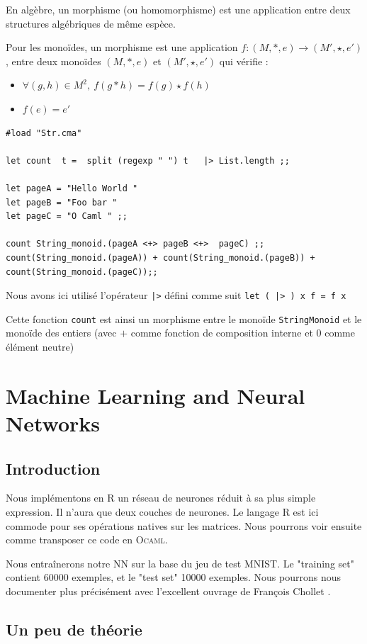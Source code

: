 En algèbre, un morphisme (ou homomorphisme) est une application entre deux structures algébriques
de même espèce.

Pour les  monoïdes, un morphisme est une application 
$f:(M,*,e)\longrightarrow (M',\star ,e')$ , entre deux monoïdes $ (M,*,e)$ et 
$(M',\star , e')$ qui vérifie :
\begin{itemize}
	\item $\forall (g,h)\in M^{2},~f(g*h)=f(g)\star f(h)$
	\item $f(e)=e'$
\end{itemize}
\begin{verbatim}
#load "Str.cma"

let count  t =  split (regexp " ") t   |> List.length ;;

let pageA = "Hello World "
let pageB = "Foo bar "
let pageC = "O Caml " ;;

count String_monoid.(pageA <+> pageB <+>  pageC) ;;
count(String_monoid.(pageA)) + count(String_monoid.(pageB)) + count(String_monoid.(pageC));;
\end{verbatim}
Nous avons ici utilisé l'opérateur \texttt{|>} défini comme suit \texttt{let ( |> ) x f = f x}

Cette fonction \texttt{count} est ainsi un morphisme entre le monoïde \texttt{StringMonoid} et 
le monoïde des entiers (avec $+$ comme fonction de composition interne et $0$
comme élément neutre)
\section{Machine Learning and Neural Networks}

\subsection{Introduction}

Nous implémentons en R un réseau de neurones réduit à sa plus simple expression.
Il n'aura que deux couches de neurones.
Le langage R est ici commode pour ses opérations natives sur les matrices.
Nous pourrons voir ensuite comme transposer ce code en \textsc{Ocaml}.

Nous entraînerons notre NN sur la base du jeu de test MNIST.
Le  "training set" contient 60000 exemples, et le "test set" 10000 exemples.
Nous pourrons nous documenter plus précisément avec l'excellent ouvrage de François Chollet \cite{deepR}.

\subsection{Un peu de théorie}

